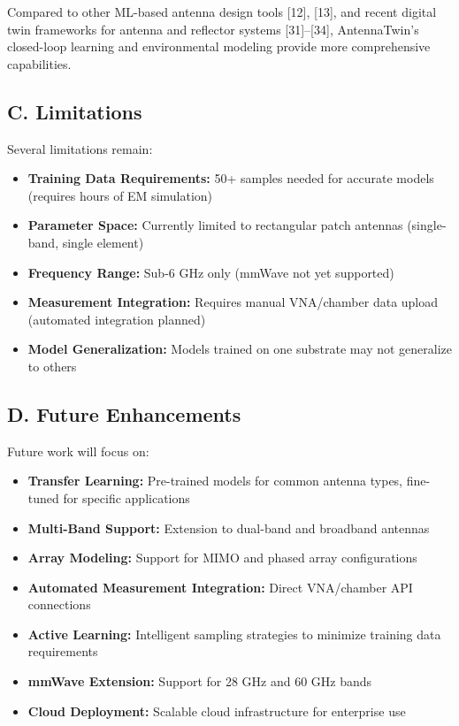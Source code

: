 \documentclass[conference]{IEEEtran}
\begin{document}
Compared to other ML-based antenna design tools [12], [13], and recent digital twin frameworks for antenna and reflector systems [31]--[34], AntennaTwin's closed-loop learning and environmental modeling provide more comprehensive capabilities.

\subsection*{C. Limitations}
Several limitations remain:
\begin{itemize}
    \item \textbf{Training Data Requirements:} 50+ samples needed for accurate models (requires hours of EM simulation)
    \item \textbf{Parameter Space:} Currently limited to rectangular patch antennas (single-band, single element)
    \item \textbf{Frequency Range:} Sub-6 GHz only (mmWave not yet supported)
    \item \textbf{Measurement Integration:} Requires manual VNA/chamber data upload (automated integration planned)
    \item \textbf{Model Generalization:} Models trained on one substrate may not generalize to others
\end{itemize}

\subsection*{D. Future Enhancements}
Future work will focus on:
\begin{itemize}
    \item \textbf{Transfer Learning:} Pre-trained models for common antenna types, fine-tuned for specific applications
    \item \textbf{Multi-Band Support:} Extension to dual-band and broadband antennas
    \item \textbf{Array Modeling:} Support for MIMO and phased array configurations
    \item \textbf{Automated Measurement Integration:} Direct VNA/chamber API connections
    \item \textbf{Active Learning:} Intelligent sampling strategies to minimize training data requirements
    \item \textbf{mmWave Extension:} Support for 28 GHz and 60 GHz bands
    \item \textbf{Cloud Deployment:} Scalable cloud infrastructure for enterprise use
\end{itemize}
\end{document}
